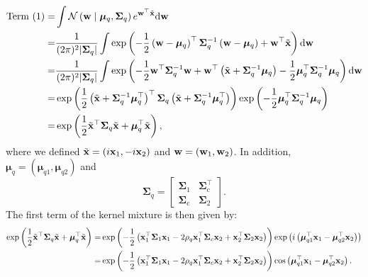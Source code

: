 \begin{equation}
\begin{aligned}
\text{Term (1)} = & \int \mathcal{N}\left({\mathbf w} \mid \boldsymbol{\mu}_{q}, \boldsymbol{\Sigma}_q\right) e^{ {\mathbf w}^{\top}\tilde{{\mathbf x}}} \mathrm{d} {\mathbf w} \\
= & \frac{1}{(2 \pi)^2 |\boldsymbol{\Sigma}_q|} \int \exp \left(-\frac{1}{2}\left({\mathbf w} - \boldsymbol{\mu}_{q} \right)^{\top} \boldsymbol{\Sigma}_q^{-1}\left({\mathbf w}-\boldsymbol{\mu}_{q} \right)+ {\mathbf w}^{\top} \tilde{{\mathbf x}}\right) \mathrm{d} {\mathbf w} \\
= & 
\frac{1}{(2 \pi)^2 |\boldsymbol{\Sigma}_q|} \int \exp \left(-\frac{1}{2} \mathbf{w}^{\top} \boldsymbol{\Sigma}_q^{-1} \mathbf{w}+\mathbf{w}^{\top}\left(\tilde{{\mathbf x}} + \boldsymbol{\Sigma}_q^{-1} \boldsymbol{\mu}_{q}\right)  -\frac{1}{2} \boldsymbol{\mu}_{q}^{\top} \boldsymbol{\Sigma}_q^{-1} \boldsymbol{\mu}_{q}\right) \mathrm{d} \mathbf{w}\\
=& \exp \left(\frac{1}{2}\left(\tilde{{\mathbf x}}+\boldsymbol{\Sigma}_q^{-1} \boldsymbol{\mu}_{q}^{\top}\right)^{\top} \boldsymbol{\Sigma}_q \left(\tilde{{\mathbf x}}+\boldsymbol{\Sigma}_q^{-1} \boldsymbol{\mu}_{q}^{\top}\right)\right) \exp \left(-\frac{1}{2} \boldsymbol{\mu}_{q}^{\top} \boldsymbol{\Sigma}_q^{-1} \boldsymbol{\mu}_{q}\right)\\
=&\exp \left(\frac{1}{2} \tilde{{\mathbf x}}^{\top} \boldsymbol{\Sigma}_q \tilde{{\mathbf x}} + \boldsymbol{\mu}_{q}^{\top} \tilde{{\mathbf x}}\right),
\end{aligned}
\end{equation}
where we defined $\tilde{{\mathbf x}}=\left(i{\mathbf x}_1,-i{\mathbf x}_2\right)$ and $\mathbf{w}=\left({\mathbf w}_{1}, {\mathbf w}_{2}\right)$. In addition, $\bm{\mu}_{q} = (\bm{\mu}_{q1},\bm{\mu}_{q2})$ and 
\[
\bm{\Sigma}_q = \begin{bmatrix}
    \bm{\Sigma}_1 & \bm{\Sigma}_{\text{c}}^{\top} \\
    \bm{\Sigma}_{\text{c}} & \bm{\Sigma}_2
\end{bmatrix}.
\]
The first term of the kernel mixture is then given by:
\begin{equation}
\begin{aligned}
 \exp \left(\frac{1}{2} \tilde{{\mathbf x}}^{\top} \boldsymbol{\Sigma}_q \tilde{{\mathbf x}} + \boldsymbol{\mu}_q^{\top} \tilde{{\mathbf x}}\right) 
= & \exp \left(-\frac{1}{2}\left({\mathbf x}_1^\top \boldsymbol{\Sigma}_1 {\mathbf x}_1 - 2 \rho_q {\mathbf x}_1^\top   \boldsymbol{\Sigma}_c {\mathbf x}_2+ {\mathbf x}_2^\top \boldsymbol{\Sigma}_2 {\mathbf x}_2\right)\right) \exp \left(i\left(\boldsymbol{\mu}_{q1}^\top  {\mathbf x}_1- \boldsymbol{\mu}_{q2}^\top {\mathbf x}_2 \right)\right) \\
= &  \exp \left(-\frac{1}{2}\left({\mathbf x}_1^\top  \boldsymbol{\Sigma}_1 {\mathbf x}_1 - 2 \rho_q {\mathbf x}_1^\top   \boldsymbol{\Sigma}_c {\mathbf x}_2 + {\mathbf x}_2^\top  \boldsymbol{\Sigma}_2 {\mathbf x}_2\right)\right) \cos \left(\boldsymbol{\mu}_{q1}^\top  {\mathbf x}_1 - \boldsymbol{\mu}_{q2}^\top  {\mathbf x}_2\right).
\end{aligned}
\end{equation}
